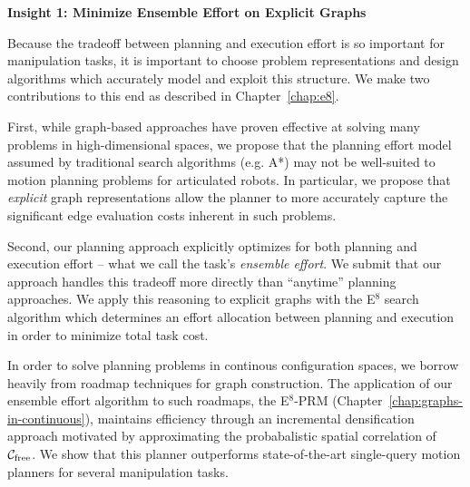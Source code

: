 \vspace{0.1in}
\noindent
\textbf{Insight 1: Minimize Ensemble Effort on Explicit Graphs}

Because the tradeoff between planning and execution effort
is so important for manipulation tasks,
it is important to choose problem representations and design algorithms
which accurately model and exploit this structure.
We make two contributions to this end
as described in Chapter~\ref{chap:e8}.

First,
while graph-based approaches have proven effective at solving
many problems in high-dimensional spaces,
we propose that the planning effort model assumed by
traditional search algorithms (e.g. A*)
may not be well-suited to motion planning problems for articulated
robots.
In particular,
we propose that \emph{explicit} graph representations
allow the planner to more accurately capture the significant
edge evaluation costs inherent in such problems.

Second,
our planning approach explicitly optimizes for both planning
and execution effort
-- what we call the task's \emph{ensemble effort}.
We submit that our approach handles this tradeoff more directly
than ``anytime'' planning approaches.
We apply this reasoning to explicit graphs
with the E$^8$ search algorithm
which determines an effort allocation between planning and execution
in order to minimize total task cost.

In order to solve planning problems in continous configuration spaces,
we borrow heavily from roadmap techniques for graph construction.
The application of our ensemble effort algorithm to such roadmaps,
the E$^8$-PRM (Chapter~\ref{chap:graphs-in-continuous}),
maintains efficiency through an
incremental densification approach
motivated by approximating the probabalistic spatial correlation of
$\mathcal{C}_{\mbox{\scriptsize free}}$.
We show that this planner outperforms state-of-the-art
single-query motion planners for several manipulation tasks.

